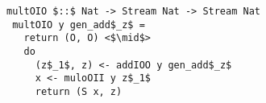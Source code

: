 \begin{figure}[!t]
  \centering
  \begin{minipage}{0.52\columnwidth}
    \begin{lstlisting}[frame=tb]
 multOIO $::$ Nat -> Stream Nat -> Stream Nat
 multOIO y gen_add$_z$ =
   return (O, O) <$\mid$>
   do
     (z$_1$, z) <- addIOO y gen_add$_z$
     x <- muloOII y z$_1$
     return (S x, z)
    \end{lstlisting}
  \end{minipage}
\end{figure}
